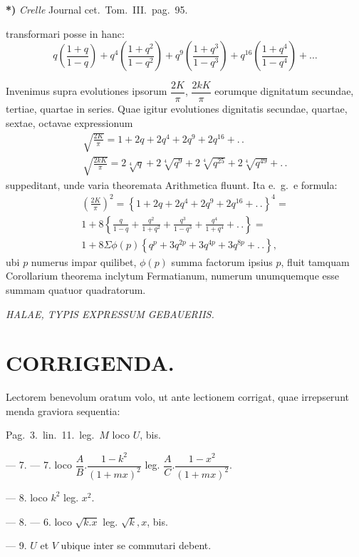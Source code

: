 \documentclass{article}
\begin{document}
\textbf{*)} \emph{Crelle} Journal cet.\ Tom.\ III.\ pag.\ 95.

transformari posse in hanc:
\[
q\left(\frac{1+q}{1-q}\right)+q^{4}\left(\frac{1+q^{2}}{1-q^{2}}\right)+q^{9}\left(\frac{1+q^{3}}{1-q^{3}}\right)+q^{16}\left(\frac{1+q^{4}}{1-q^{4}}\right)+\ldots
\]

Invenimus supra evolutiones ipsorum $\dfrac{2K}{\pi}$, $\dfrac{2kK}{\pi}$ eorumque dignitatum secundae, tertiae, quartae in series. Quae igitur evolutiones dignitatis secundae, quartae, sextae, octavae expressionum
\[
\begin{gathered}
\sqrt{\frac{2K}{\pi}}=1+2q+2q^{4}+2q^{9}+2q^{16}+.\,.\\[2ex]
\sqrt{\frac{2kK}{\pi}}=2\sqrt[4]{q}+2\sqrt[4]{q^{9}}+2\sqrt[4]{q^{25}}+2\sqrt[4]{q^{49}}+.\,.
\end{gathered}
\]
suppeditant, unde varia theoremata Arithmetica fluunt. Ita e.\ g.\ e formula:
\[
\begin{gathered}
\left(\frac{2K}{\pi}\right)^{2}=\left\{1+2q+2q^{4}+2q^{9}+2q^{16}+.\,.\right\}^{4}=\\[1.5ex]
1+8\left\{\frac{q}{1-q}+\frac{q^{2}}{1+q^{2}}+\frac{q^{3}}{1-q^{3}}+\frac{q^{4}}{1+q^{4}}+.\,.\right\}=\\[1.5ex]
1+8\Sigma\phi(p)\left\{q^{p}+3q^{2p}+3q^{4p}+3q^{8p}+.\,.\right\},
\end{gathered}
\]
ubi $p$ numerus impar quilibet, $\phi(p)$ summa factorum ipsius $p$, fluit tamquam Corollarium theorema inclytum Fermatianum, numerum unumquemque esse summam quatuor quadratorum.

\emph{HALAE, TYPIS EXPRESSUM GEBAUERIIS.}


\section*{CORRIGENDA.}

Lectorem benevolum oratum volo, ut ante lectionem corrigat, quae irrepserunt menda graviora sequentia:

Pag.\ 3.\ lin.\ 11.\ leg.\ $M$ loco $U$, bis.

--- 7. --- 7. loco $\dfrac{A}{B}.\dfrac{1-k^{2}}{(1+mx)^{2}}$ leg. $\dfrac{A}{C}.\dfrac{1-x^{2}}{(1+mx)^{2}}$.

--- 8. loco $k^{2}$ leg. $x^{2}$.

--- 8. --- 6. loco $\sqrt{k.x}$ leg. $\sqrt{k},x$, bis.

--- 9. $U$ et $V$ ubique inter se commutari debent.
\end{document}
